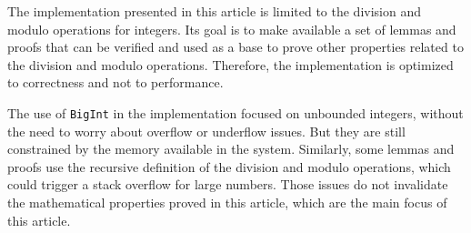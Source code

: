 The implementation presented in this article is limited to the division and
modulo operations for integers. Its goal is to make available a set of lemmas
and proofs that can be verified and used as a base to prove other properties
related to the division and modulo operations. Therefore, the implementation
is optimized to correctness and not to performance.

The use of \texttt{BigInt} in the implementation focused on unbounded
integers, without the need to worry about overflow or underflow issues. But
they are still constrained by the memory available in the system. Similarly,
some lemmas and proofs use the recursive definition of the division and modulo
operations, which could trigger a stack overflow for large numbers. Those
issues do not invalidate the mathematical properties proved in this article,
which are the main focus of this article.
